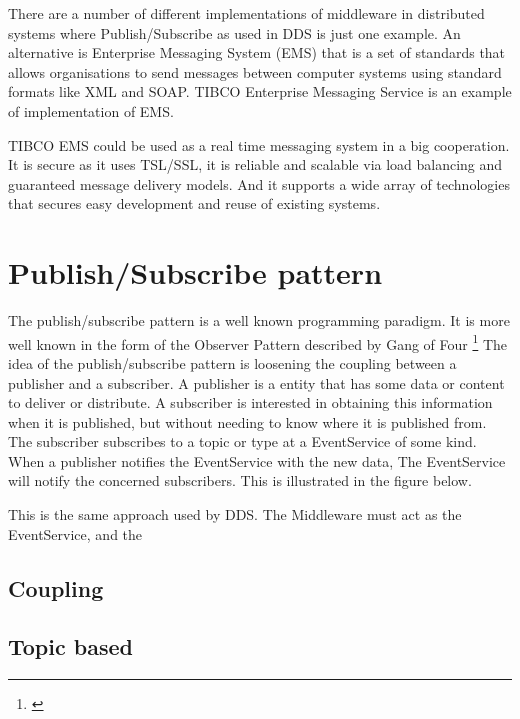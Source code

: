 There are a number of different implementations of middleware in distributed systems where Publish/Subscribe as used in DDS is just one example. An alternative is Enterprise Messaging System (EMS) that is a set of standards that allows organisations to send messages between computer systems using standard formats like XML and SOAP.
TIBCO Enterprise Messaging Service is an example of implementation of EMS.

TIBCO EMS could be used as a real time messaging system in a big cooperation. It is secure as it uses TSL/SSL, it is reliable and scalable via load balancing and guaranteed message delivery models. And it supports a wide array of technologies that secures easy development and reuse of existing systems.

\section{Publish/Subscribe pattern}
The publish/subscribe pattern is a well known programming paradigm. It is more well known in the form of the Observer Pattern described by Gang of Four \footnote{\citep{DesignPatterns}}
The idea of the publish/subscribe pattern is loosening the coupling between a publisher and a subscriber. A publisher is a entity that has some data or content to deliver or distribute. A subscriber is interested in obtaining this information when it is published, but without needing to know where it is published from.
The subscriber subscribes to a topic or type at a EventService of some kind. When a publisher notifies the EventService with the new data, The EventService will notify the concerned subscribers. This is illustrated in the figure below.

\begin{center}
\end{center}

This is the same approach used by DDS. The Middleware must act as the EventService, and the 

\subsection{Coupling}


\subsection{Topic based}
